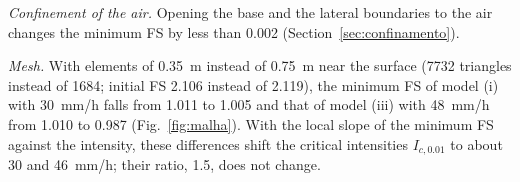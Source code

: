 \emph{Confinement of the air.} Opening the base and the lateral boundaries to the air changes the minimum FS by less
than 0.002 (Section~\ref{sec:confinamento}).

\emph{Mesh.} With elements of 0.35~m instead of 0.75~m near the surface (7732 triangles instead of 1684; initial FS
2.106 instead of 2.119), the minimum FS of model (i) with 30~mm/h falls from 1.011 to 1.005 and that of model (iii)
with 48~mm/h from 1.010 to 0.987 (Fig.~\ref{fig:malha}). With the local slope of the minimum FS against the intensity,
these differences shift the critical intensities $I_{c,0.01}$ to about 30 and 46~mm/h; their ratio, 1.5, does not
change.
